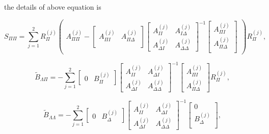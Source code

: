 the details of above equation is 

\begin{equation}
S_{\Pi \Pi} = \sum_{j = 1}^{2} R_{\Pi}^{(j)} \begin{pmatrix}
A_{\Pi \Pi}^{(j)} - \begin{bmatrix}
A_{\Pi I}^{(j)} & A_{\Pi \Delta}^{(j)} \\
\end{bmatrix} \begin{bmatrix}
A_{II}^{(j)} & A_{I \Delta}^{(j)} \\
A_{\Delta I}^{(j)} & A_{\Delta \Delta}^{(j)}
\end{bmatrix}^{-1} \begin{bmatrix}
A_{\Pi I}^{(j)} \\ A_{\Pi \Delta}^{(j)} \\
\end{bmatrix}
\end{pmatrix} R_{\Pi}^{(j)} ,
\end{equation}

\begin{equation}
\tilde{B}_{\Lambda \Pi} = - \sum_{j = 1}^{2} \begin{bmatrix}
0 & B_{\Pi}^{(j)}
\end{bmatrix} \begin{bmatrix}
A_{II}^{(j)} & A_{\Delta I}^{(j)} \\
A_{\Delta I}^{(j)} & A_{\Delta \Delta}^{(j)}
\end{bmatrix}^{-1} \begin{bmatrix}
A_{\Pi I}^{(j)} \\ A_{\Pi \Delta}^{(j)}
\end{bmatrix} R_{\Pi}^{(j)} ,
\end{equation}

\begin{equation}
\tilde{B}_{\Lambda \Lambda} = - \sum_{j = 1}^{2} \begin{bmatrix}
0 & B_{\Delta}^{(j)}
\end{bmatrix} \begin{bmatrix}
A_{II}^{(j)} & A_{\Delta I}^{(j)} \\
A_{\Delta I}^{(j)} & A_{\Delta \Delta}^{(j)}
\end{bmatrix}^{-1} \begin{bmatrix}
0 \\B_{\Delta}^{(j)} \\
\end{bmatrix} ,
\end{equation}

